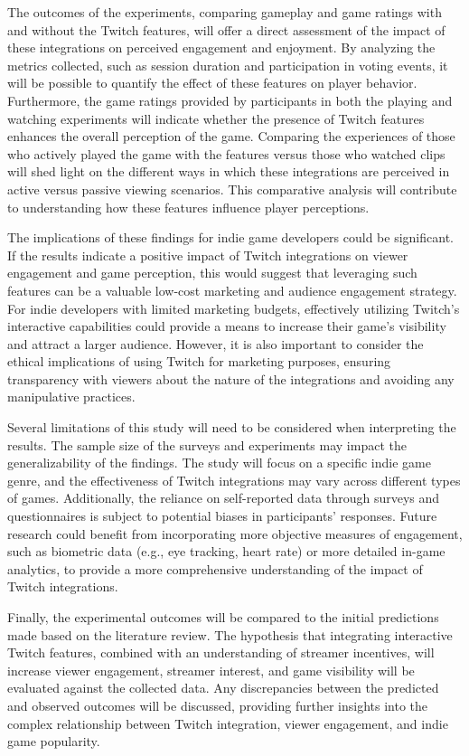 \documentclass[conference]{IEEEtran}
\begin{document}
The outcomes of the experiments, comparing gameplay and game ratings with and without the Twitch features, will offer a direct assessment of the impact of these integrations on perceived engagement and enjoyment. By analyzing the metrics collected, such as session duration and participation in voting events, it will be possible to quantify the effect of these features on player behavior. Furthermore, the game ratings provided by participants in both the playing and watching experiments will indicate whether the presence of Twitch features enhances the overall perception of the game. Comparing the experiences of those who actively played the game with the features versus those who watched clips will shed light on the different ways in which these integrations are perceived in active versus passive viewing scenarios. This comparative analysis will contribute to understanding how these features influence player perceptions.

The implications of these findings for indie game developers could be significant. If the results indicate a positive impact of Twitch integrations on viewer engagement and game perception, this would suggest that leveraging such features can be a valuable low-cost marketing and audience engagement strategy. For indie developers with limited marketing budgets, effectively utilizing Twitch's interactive capabilities could provide a means to increase their game's visibility and attract a larger audience. However, it is also important to consider the ethical implications of using Twitch for marketing purposes, ensuring transparency with viewers about the nature of the integrations and avoiding any manipulative practices.

Several limitations of this study will need to be considered when interpreting the results. The sample size of the surveys and experiments may impact the generalizability of the findings. The study will focus on a specific indie game genre, and the effectiveness of Twitch integrations may vary across different types of games. Additionally, the reliance on self-reported data through surveys and questionnaires is subject to potential biases in participants' responses. Future research could benefit from incorporating more objective measures of engagement, such as biometric data (e.g., eye tracking, heart rate) or more detailed in-game analytics, to provide a more comprehensive understanding of the impact of Twitch integrations.

Finally, the experimental outcomes will be compared to the initial predictions made based on the literature review. The hypothesis that integrating interactive Twitch features, combined with an understanding of streamer incentives, will increase viewer engagement, streamer interest, and game visibility will be evaluated against the collected data. Any discrepancies between the predicted and observed outcomes will be discussed, providing further insights into the complex relationship between Twitch integration, viewer engagement, and indie game popularity.
\end{document}
